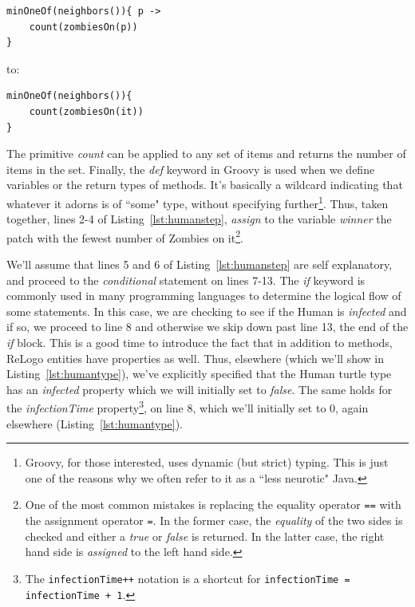 \documentclass[11pt]{amsart}
\begin{document}
\noindent\begin{minipage}[h]{\textwidth}
\vspace{.2in}
\lstset{language=java, numbers=none}
\begin{lstlisting}
minOneOf(neighbors()){ p ->
	count(zombiesOn(p))
} 
\end{lstlisting}
\vspace{.2in}
to:
\vspace{.2in}
\lstset{language=java}
\begin{lstlisting}
minOneOf(neighbors()){
	count(zombiesOn(it))
} 
\end{lstlisting}
\vspace{.2in}
\end{minipage}

The primitive \emph{count} can be applied to any set of items and returns the number of items in the set. Finally, the \emph{def} keyword in Groovy is used when we define variables or the return types of methods. It's basically a wildcard indicating that whatever it adorns is of ``some" type, without specifying further\footnote{Groovy, for those interested, uses dynamic (but strict) typing. This is just one of the reasons why we often refer to it as a ``less neurotic" Java.}. Thus, taken together, lines 2-4 of Listing~\ref{lst:humanstep}, \emph{assign} to the variable \emph{winner} the patch with the fewest number of Zombies on it\footnote{One of the most common mistakes is replacing the equality operator \texttt{==} with the assignment operator \texttt{=}. In the former case, the \emph{equality} of the two sides is checked and either a \emph{true} or \emph{false} is returned. In the latter case, the right hand side is \emph{assigned} to the left hand side.}.

We'll assume that lines 5 and 6 of Listing~\ref{lst:humanstep} are self explanatory, and proceed to the \emph{conditional} statement on lines 7-13. The \emph{if} keyword is commonly used in many programming languages to determine the logical flow of some statements. In this case, we are checking to see if the Human is \emph{infected} and if so, we proceed to line 8 and otherwise we skip down past line 13, the end of the \emph{if} block. This is a good time to introduce the fact that in addition to methods, ReLogo entities have properties as well. Thus, elsewhere (which we'll show in Listing~\ref{lst:humantype}), we've explicitly specified that the Human turtle type has an \emph{infected} property which we will initially set to \emph{false}. The same holds for the \emph{infectionTime} property\footnote{The \texttt{infectionTime++} notation is a shortcut for \texttt{infectionTime = infectionTime + 1}.}, on line 8, which we'll initially set to 0, again elsewhere (Listing~\ref{lst:humantype}).
\end{document}
